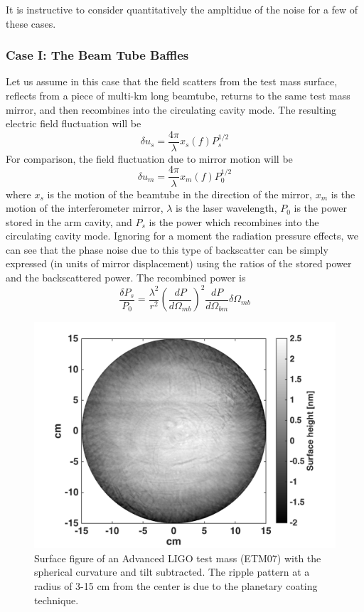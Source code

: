 It is instructive to consider quantitatively the ampltidue of the noise for a few of
these cases.
\subsubsection{Case I: The Beam Tube Baffles}
Let us assume in this case that the field scatters from the test mass surface,
reflects from a piece of multi-km long beamtube, returns to the same test mass
mirror, and then recombines into the circulating cavity mode. The resulting electric
field fluctuation will be
\begin{equation}
\delta u_{s} = \frac{4 \pi}{\lambda} x_{s}(f) P_s^{1/2}
\end{equation}
For comparison, the field fluctuation due to mirror motion will be
\begin{equation}
\delta u_{m} = \frac{4 \pi}{\lambda} x_{m}(f) P_0^{1/2}
\end{equation}
where $x_s$ is the motion of the beamtube in the direction of the mirror, $x_m$
is the motion of the interferometer mirror, $\lambda$ is the laser wavelength,
$P_0$ is the power stored in the arm cavity, and $P_s$ is the power which
recombines into the circulating cavity mode. Ignoring for a moment the radiation
pressure effects, we can see that the phase noise due to this type of backscatter
can be simply expressed (in units of mirror displacement) using the ratios of
the stored power and the backscattered power. The recombined power is
\begin{equation}
\frac{\delta P_s}{P_0} = \frac{\lambda^2}{r^2} \left( \frac{dP}{d\Omega_{mb}}\right)^2 \frac{dP}{d\Omega_{bm}} \delta \Omega_{mb}
\end{equation}

\begin{figure}[h]
  \centering
    \includegraphics[width=\columnwidth]{Figures/ETMphasemap.png}
    \caption{Surface figure of an Advanced LIGO test mass (ETM07) with the
    spherical curvature and tilt subtracted. The ripple pattern at a radius
    of 3-15 cm from the center is due to the planetary coating technique.}
    \label{fig:PhaseMap}
\end{figure}

